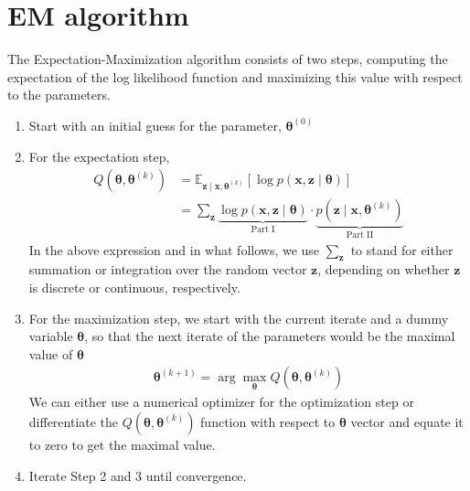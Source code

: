 \documentclass[12pt]{article}
\newcommand{\bx}{\ensuremath{\mathbf{x}}}
\newcommand{\bz}{\ensuremath{\mathbf{z}}}
\newcommand{\btheta}{\ensuremath{\boldsymbol{\theta}}}
\begin{document}
\section{EM algorithm}
The Expectation-Maximization algorithm consists of two steps, computing the expectation of the log likelihood function and maximizing this value with respect to the parameters.
\begin{enumerate}
\item Start with an initial guess for the parameter, $\btheta^{(0)}$
\item For the expectation step,
\begin{align}
\label{eqn:expectation}
Q(\btheta, \btheta^{(k)}) & = \mathbb{E}_{\bz \mid \bx, \btheta^{(k)}} [\log p(\bx, \bz \mid \btheta)] \\
& = \sum_{\bz} \underbrace{\log p(\bx, \bz \mid \btheta)}_{\text{Part I}} \cdot \underbrace{p(\bz \mid \bx, \btheta^{(k)})}_{\text{Part II}}
\end{align}
In the above expression and in what follows, we use $\sum_{\bz}$ to stand for either summation or integration over the random vector $\bz$, depending on whether $\bz$ is discrete or continuous, respectively.
\item For the maximization step, we start with the current iterate and a dummy variable $\btheta$, so that the next iterate of the parameters would be the maximal value of $\btheta$
\begin{align}
\label{eqn:maximization}
\btheta^{(k+1)} = \arg \max_{\btheta} Q(\btheta, \btheta^{(k)}) 
\end{align}
We can either use a numerical optimizer for the optimization step or differentiate the $Q(\btheta, \btheta^{(k)})$ function with respect to $\btheta$ vector and equate it to zero to get the maximal value.
\item Iterate Step 2 and 3 until convergence.
\end{enumerate}
\end{document}

